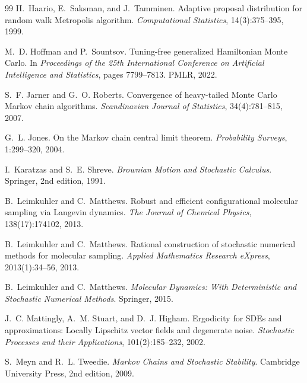\documentclass[11pt,a4paper]{report}
\begin{document}
\begin{thebibliography}{99}
H.~Haario, E.~Saksman, and J.~Tamminen.
\newblock Adaptive proposal distribution for random walk {M}etropolis
  algorithm.
\newblock \emph{Computational Statistics}, 14(3):375--395, 1999.

M.~D. Hoffman and P.~Sountsov.
\newblock Tuning-free generalized {H}amiltonian {M}onte {C}arlo.
\newblock In \emph{Proceedings of the 25th International Conference on
  Artificial Intelligence and Statistics}, pages 7799--7813. PMLR, 2022.

S.~F. Jarner and G.~O. Roberts.
\newblock Convergence of heavy-tailed {M}onte {C}arlo {M}arkov chain
  algorithms.
\newblock \emph{Scandinavian Journal of Statistics}, 34(4):781--815, 2007.

G.~L. Jones.
\newblock On the {M}arkov chain central limit theorem.
\newblock \emph{Probability Surveys}, 1:299--320, 2004.

I.~Karatzas and S.~E. Shreve.
\newblock \emph{Brownian Motion and Stochastic Calculus}.
\newblock Springer, 2nd edition, 1991.

B.~Leimkuhler and C.~Matthews.
\newblock Robust and efficient configurational molecular sampling via
  {L}angevin dynamics.
\newblock \emph{The Journal of Chemical Physics}, 138(17):174102, 2013.

B.~Leimkuhler and C.~Matthews.
\newblock Rational construction of stochastic numerical methods for
  molecular sampling.
\newblock \emph{Applied Mathematics Research eXpress}, 2013(1):34--56,
  2013.

B.~Leimkuhler and C.~Matthews.
\newblock \emph{Molecular Dynamics: With Deterministic and Stochastic
  Numerical Methods}.
\newblock Springer, 2015.

J.~C. Mattingly, A.~M. Stuart, and D.~J. Higham.
\newblock Ergodicity for {SDE}s and approximations: Locally {L}ipschitz vector
  fields and degenerate noise.
\newblock \emph{Stochastic Processes and their Applications},
  101(2):185--232, 2002.

S.~Meyn and R.~L. Tweedie.
\newblock \emph{Markov Chains and Stochastic Stability}.
\newblock Cambridge University Press, 2nd edition, 2009.


\end{thebibliography}
\end{document}
